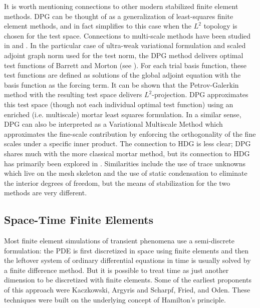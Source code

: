 \documentclass{article}
\theoremstyle{definition}
\theoremstyle{remark}
\begin{document}
It is worth mentioning connections to other modern stabilized finite element methods. 
DPG can be thought of as a generalization of least-squares finite element methods, and in fact simplifies to this case
when the $L^2$ topology is chosen for the test space.
Connections to multi-scale methods have been studied in \cite{Cohen2012} and \cite{ChanEvansQiu2014}.
In the particular case of ultra-weak variational formulation and scaled adjoint graph norm used for the test norm,
the DPG method delivers optimal test functions of Barrett and Morton (see \cite{LocalGlobalDPG}).
For each trial basis function, these test functions are defined as solutions 
of the global adjoint equation with the basis function as the forcing term. 
It can be shown that the Petrov-Galerkin method with the resulting test space delivers $L^2$-projection.  
DPG approximates this test space (though not each individual optimal test function) 
using an enriched (i.e. multiscale) mortar least squares formulation.  
In a similar sense, DPG can also be interpreted as a Variational Multiscale Method
which approximates the fine-scale contribution by enforcing the orthogonality of the 
fine scales under a specific inner product.  
The connection to HDG is less clear; DPG shares much with the more classical mortar method, 
but its connection to HDG has primarily been explored in \cite{MoroMastersThesis}.
Similarities include the use of trace unknowns which live on the mesh skeleton and the use of static condensation 
to eliminate the interior degrees of freedom, but the means of stabilization for the two methods are very different.


\subsection{Space-Time Finite Elements}
Most finite element simulations of transient phenomena use a semi-discrete formulation:
the PDE is first discretized in space using finite elements and then the leftover system of ordinary differential equations in time
is usually solved by a finite difference method.
But it is possible to treat time as just another dimension to be discretized with finite elements.
Some of the earliest proponents of this approach were Kaczkowski\cite{Kaczkowski1975}, 
Argyris and Scharpf\cite{ArgyrisSpaceTime}, Fried\cite{FriedSpaceTime}, and Oden\cite{OdenSpaceTime}.
These techniques were built on the underlying concept of Hamilton's principle.
\end{document}
